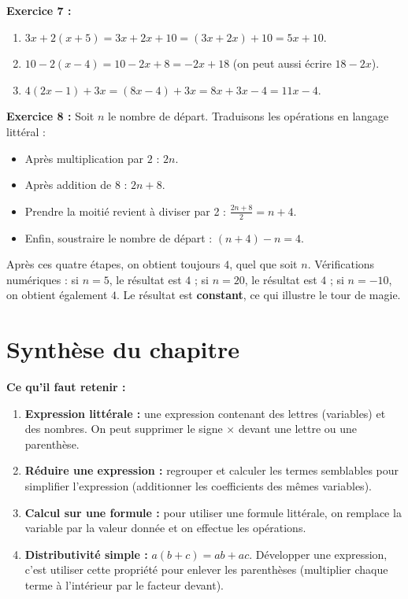 \medskip

\noindent \textbf{Exercice 7 :} 
\begin{enumerate}[label=\alph*)] 
\item $3x + 2(x+5) = 3x + 2x + 10 = (3x+2x) + 10 = 5x + 10$. 
\item $10 - 2(x-4) = 10 - 2x + 8 = -2x + 18$ (on peut aussi écrire $18 - 2x$). 
\item $4(2x - 1) + 3x = (8x - 4) + 3x = 8x + 3x - 4 = 11x - 4$. \end{enumerate}

\medskip

\noindent \textbf{Exercice 8 :} Soit $n$ le nombre de départ. Traduisons les opérations en langage littéral : 
\begin{itemize} 
\item Après multiplication par $2$ : $2n$. 
\item Après addition de $8$ : $2n + 8$. 
\item Prendre la moitié revient à diviser par 2 : $\frac{2n + 8}{2} = n + 4$. 
\item Enfin, soustraire le nombre de départ : $(n + 4) - n = 4$. \end{itemize} 

Après ces quatre étapes, on obtient toujours $\boxed{4}$, quel que soit $n$.
Vérifications numériques : si $n=5$, le résultat est $4$ ; si $n=20$, le résultat est $4$ ; si $n=-10$, on obtient également $4$. Le résultat est \textbf{constant}, ce qui illustre le tour de magie.

\section{Synthèse du chapitre}
\textbf{Ce qu'il faut retenir :} 
\begin{enumerate} 
\item \textbf{Expression littérale :} une expression contenant des lettres (variables) et des nombres. On peut supprimer le signe $\times$ devant une lettre ou une parenthèse. 
\item \textbf{Réduire une expression :} regrouper et calculer les termes semblables pour simplifier l'expression (additionner les coefficients des mêmes variables). 
\item \textbf{Calcul sur une formule :} pour utiliser une formule littérale, on remplace la variable par la valeur donnée et on effectue les opérations. 
\item \textbf{Distributivité simple :} $a(b+c) = ab + ac$. Développer une expression, c'est utiliser cette propriété pour enlever les parenthèses (multiplier chaque terme à l'intérieur par le facteur devant). 
\end{enumerate}
